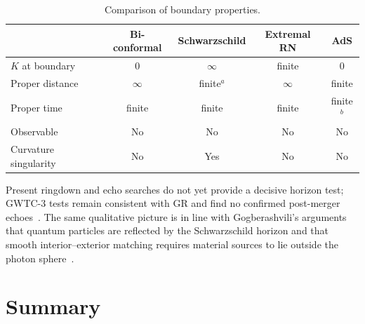 \documentclass[11pt]{article}
\begin{document}
\begin{table}[ht]
\caption{Comparison of boundary properties.
\label{tab:comparison_app12}}
\begin{center}
\begin{tabular}{lcccc}
\hline\hline
 & Bi-conformal & Schwarzschild
 & Extremal RN & AdS \\
\hline
$K$ at boundary
  & $0$ & $\infty$ & finite & $0$ \\
Proper distance
  & $\infty$ & finite$^{a}$ & $\infty$ & finite \\
Proper time
  & finite & finite & finite & finite$^{b}$ \\
Observable
  & No & No & No & No \\
Curvature singularity
  & No & Yes & No & No \\
\hline\hline
\end{tabular}
\end{center}
\smallskip{}
\end{table}

Present ringdown and echo searches do not yet provide a decisive
horizon test; GWTC-3 tests remain consistent with GR and find no
confirmed post-merger echoes~\cite{Cardoso2019,Miani2023,LVK2025TGR}.
The same
qualitative picture is in line with Gogberashvili's arguments
that quantum particles are reflected by the Schwarzschild
horizon and that smooth interior--exterior matching requires
material sources to lie outside the photon sphere~\cite{Gogberashvili2018,Gogberashvili2019}.


\section{Summary}
\end{document}
